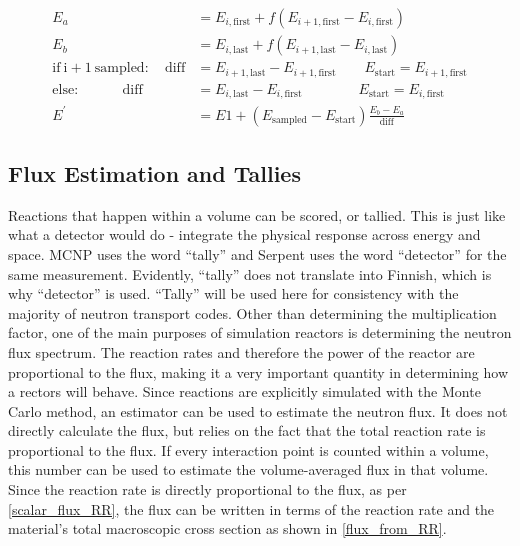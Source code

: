 \begin{equation}
\label{energy_scaling}
\begin{split}
E_a &= E_{i,\mathrm{first}} +  f( E_{i+1,\mathrm{first}} - E_{i,\mathrm{first}} ) \\
E_b &= E_{i,\mathrm{last}} +  f( E_{i+1,\mathrm{last}} - E_{i,\mathrm{last}} ) \\
\mathrm{if\:i+1\:sampled:} \quad \mathrm{diff} &= E_{i+1,\mathrm{last}}  - E_{i+1,\mathrm{first}}  \qquad E_\mathrm{start}= E_{i+1,\mathrm{first}}  \\
\mathrm{else:}          \qquad \quad       \mathrm{diff} &= E_{i,\mathrm{last}}  - E_{i,\mathrm{first}}  \qquad \qquad E_\mathrm{start}= E_{i,\mathrm{first}}  \\
E^\prime &=  E1  +  ( E_\mathrm{sampled} - E_\mathrm{start})  \frac{ E_b - E_a}{ \mathrm{diff} }  
\end{split}
\end{equation}


\subsection{Flux Estimation and Tallies}

Reactions that happen within a volume can be scored, or tallied.  This is just like what a detector would do - integrate the physical response across energy and space.  MCNP uses the word ``tally'' and Serpent uses the word ``detector'' for the same measurement.  Evidently, ``tally'' does not translate into Finnish, which is why ``detector'' is used.  ``Tally'' will be used here for consistency with the majority of neutron transport codes.  Other than determining the multiplication factor, one of the main purposes of simulation reactors is determining the neutron flux spectrum.  The reaction rates and therefore the power of the reactor are proportional to the flux, making it a very important quantity in determining how a rectors will behave.  Since reactions are explicitly simulated with the  Monte Carlo method, an estimator can be used to estimate the neutron flux.  It does not directly calculate the flux, but relies on the fact that the total reaction rate is proportional to the flux.  If every interaction point is counted within a volume, this number can be used to estimate the volume-averaged flux in that volume.  Since the reaction rate is directly proportional to the flux, as per \eqref{scalar_flux_RR}, the flux can be written in terms of the reaction rate and the material's total macroscopic cross section as shown in \eqref{flux_from_RR}.

